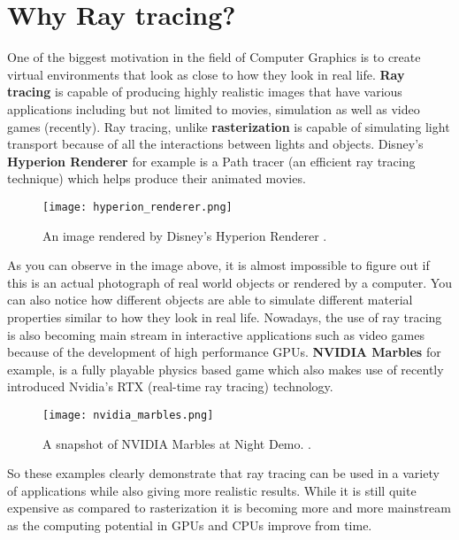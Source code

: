 \documentclass[11pt,a4paper]{article}
\begin{document}
	\section{Why Ray tracing?}
	One of the biggest motivation in the field of Computer Graphics is to create virtual environments that look as close to how they look in real life. \textbf{Ray tracing} is capable of producing highly realistic images that have various applications including but not limited to movies, simulation as well as video games (recently). Ray tracing, unlike \textbf{rasterization} is capable of simulating light transport because of all the interactions between lights and objects. Disney's \textbf{Hyperion Renderer} for example is a Path tracer (an efficient ray tracing technique) which helps produce their animated movies.
	\begin{figure}[H]
		\centering
		\texttt{[image: hyperion\_renderer.png]}
		\caption{\centering An image rendered by Disney's Hyperion Renderer \protect\cite{burley2018design}.}
	\end{figure}
	\noindent
	As you can observe in the image above, it is almost impossible to figure out if this is an actual photograph of real world objects or rendered by a computer. You can also notice how different objects are able to simulate different material properties similar to how they look in real life. Nowadays, the use of ray tracing is also becoming main stream in interactive applications such as video games because of the development of high performance GPUs. \textbf{NVIDIA Marbles} for example, is a fully playable physics based game which also makes use of recently introduced Nvidia's RTX (real-time ray tracing) technology. 
	\begin{figure}[H]
		\centering
		\texttt{[image: nvidia\_marbles.png]}
		\caption{\centering A snapshot of NVIDIA Marbles at Night Demo. \protect\cite{nvidiamarbles}.}
	\end{figure}
	\noindent
	So these examples clearly demonstrate that ray tracing can be used in a variety of applications while also giving more realistic results. While it is still quite expensive as compared to rasterization it is becoming more and more mainstream as the computing potential in GPUs and CPUs improve from time.
	
\end{document}
